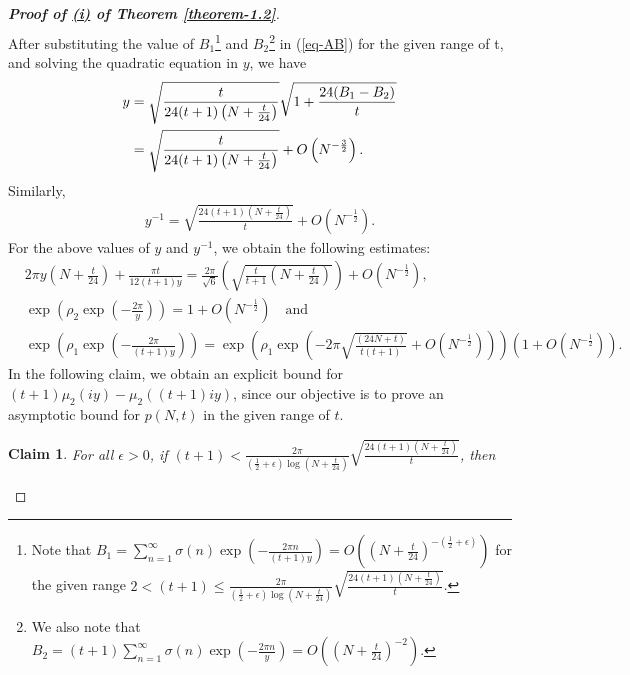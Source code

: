 \documentclass[11pt]{amsart}
\theoremstyle{plain}
\newtheorem{claim}[]{Claim}
\numberwithin{equation}{section}
\begin{document}
\begin{proof}[\textbf{\boldmath Proof of \hyperlink{thm1.2i}{{(i)}} of Theorem \ref{theorem-1.2}}]
\begin{align*}
			\end{align*}
			After substituting the value of $B_1$\footnote{Note that $B_1=\sum_{n=1}^{\infty}\sigma(n)\exp\left(-\frac{2\pi n}{(t+1)y}\right)=O\left(\left(N+\frac{t}{24}\right)^{-(\frac{1}{2}+\epsilon)}\right)$ for the given range   $2<(t+1)\le\frac{2\pi}{(\frac{1}{2}+\epsilon)\log \left(N+\frac{t}{24}\right)}\sqrt{\frac{24(t+1)\left(N+\frac{t}{24}\right)}{t}}$.} and $B_2$\footnote{We also note that $B_2=(t+1) \sum_{n=1}^{\infty}\sigma(n)\exp\left(-\frac{2\pi n}{y}\right)=O\left(\left(N+\frac{t}{24}\right)^{-2}\right)$.} in (\ref{eq-AB}) for the given range of t, and solving the quadratic equation in $y$, we have
			\begin{align}\label{eq-solutiony}
				\notag
				y&=\sqrt{\frac{t}{24(t+1)\left(N + \frac{t}{24}\right)}}\sqrt{1+\frac{24(B_1-B_2)}{t}}\\
				&= \sqrt{\frac{t}{24(t+1)\left(N + \frac{t}{24}\right)}}+O\left(N^{-\frac{3}{2}}\right).  
			\end{align}
			Similarly,
			\begin{align}\label{eq-yinvese}
				y^{-1}=\sqrt{\frac{24(t+1)\left(N + \frac{t}{24}\right)}{t}}+O\left(N^{-\frac{1}{2}}\right).    
			\end{align}
			For the above values of $y$ and $y^{-1}$, we obtain the following estimates:
			\begin{equation}\label{eq-estimates}
				\begin{aligned}
					&2\pi y\left(N+\frac{t}{24}\right)+\frac{\pi t}{12(t+1)y}=\frac{2\pi}{\sqrt{6}}\left(\sqrt{\frac{t}{t+1}\left(N+\frac{t}{24}\right)}\right)+O(N^{-\frac{1}{2}}),\\
					&\exp\left(\rho_2\exp\left(-\frac{2\pi}{y}\right)\right)=1+O\left(N^{-\frac{1}{2}}\right)\quad \text{and}\\
					&\exp\left(\rho_1\exp\left(-\frac{2\pi}{(t+1)y}\right)\right)=\exp\left(\rho_1\exp\left(-2\pi\sqrt{\frac{(24N+t)}{t(t+1)}}+O\left(N^{-\frac{1}{2}}\right)\right)\right)\left(1+O\left(N^{-\frac{1}{2}}\right)\right).
				\end{aligned}
			\end{equation}
			In the following claim, we obtain an explicit bound for $(t+1)\mu_{2}(iy)-\mu_{2}((t+1)iy)$, since our objective is to prove an asymptotic bound for $p(N,t)$ in the given range of $t$.
			\begin{claim}\label{claim-1}
				For all $\epsilon>0$, if $(t+1)<\frac{2\pi}{(\frac{1}{2}+\epsilon)\log \left(N+\frac{t}{24}\right)}\sqrt{\frac{24(t+1)\left(N+\frac{t}{24}\right)}{t}}$, then

\end{claim}
\end{proof}
\end{document}
